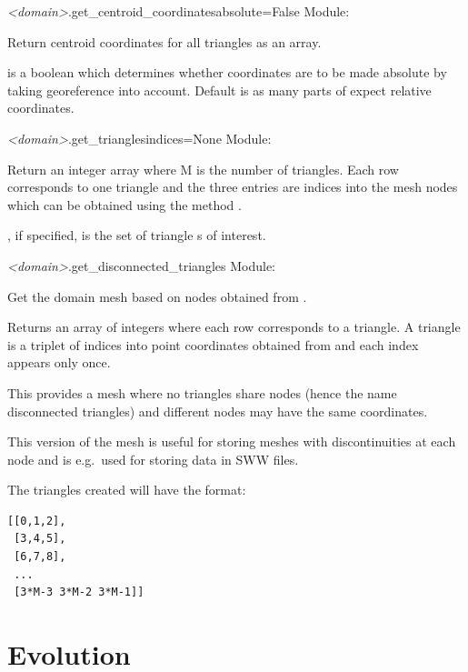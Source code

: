 \documentclass{manual}
\begin{document}
\begin{methoddesc}{\emph{<domain>}.get_centroid_coordinates}{absolute=False}
Module: 

Return centroid coordinates for all triangles as an  array.
    
 is a boolean which determines whether coordinates
are to be made absolute by taking georeference into account.
Default is  as many parts of \anuga expect relative coordinates.
\end{methoddesc}

\begin{methoddesc}{\emph{<domain>}.get_triangles}{indices=None}
Module: 

Return an  integer array where M is the number of triangles.
Each row corresponds to one triangle and the three entries are
indices into the mesh nodes which can be obtained using the method
.

, if specified, is the set of triangle s of interest.
\end{methoddesc}

\begin{methoddesc}{\emph{<domain>}.get_disconnected_triangles}{}
Module: 

Get the domain mesh based on nodes obtained from .

Returns an  array of integers where each row corresponds to
a triangle. A triangle is a triplet of indices into
point coordinates obtained from  and each
index appears only once.

This provides a mesh where no triangles share nodes
(hence the name disconnected triangles) and different
nodes may have the same coordinates.

This version of the mesh is useful for storing meshes with
discontinuities at each node and is e.g.\ used for storing
data in SWW files.

The triangles created will have the format:

\begin{verbatim}
[[0,1,2],
 [3,4,5],
 [6,7,8],
 ...
 [3*M-3 3*M-2 3*M-1]]
\end{verbatim}
\end{methoddesc}

\section{Evolution}
\label{sec:evolution}
\end{document}
